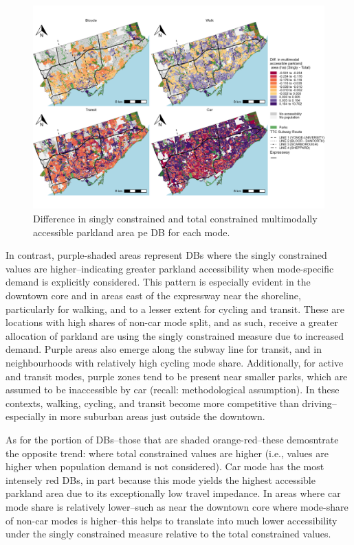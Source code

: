 \documentclass[
11pt, %
oneside, %
english, %
singlespacing, %
]{macthesis} %
\begin{document}
\begin{figure}

{\centering \includegraphics[width=6in]{./data/figures/chp5-mm_parkland_diff_conc_access_DB_plots} 

}

\caption{\label{fig:chp5-mm_parkland_diff_conc_access_DB_plots}Difference in singly constrained and total constrained multimodally accessible parkland area pe DB for each mode.}\label{fig:unnamed-chunk-78}
\end{figure}

In contrast, purple-shaded areas represent DBs where the singly constrained values are higher--indicating greater parkland accessibility when mode-specific demand is explicitly considered. This pattern is especially evident in the downtown core and in areas east of the expressway near the shoreline, particularly for walking, and to a lesser extent for cycling and transit. These are locations with high shares of non-car mode split, and as such, receive a greater allocation of parkland are using the singly constrained measure due to increased demand. Purple areas also emerge along the subway line for transit, and in neighbourhoods with relatively high cycling mode share. Additionally, for active and transit modes, purple zones tend to be present near smaller parks, which are assumed to be inaccessible by car (recall: methodological assumption). In these contexts, walking, cycling, and transit become more competitive than driving--especially in more suburban areas just outside the downtown.

As for the portion of DBs--those that are shaded orange-red--these demosntrate the opposite trend: where total constrained values are higher (i.e., values are higher when population demand is not considered). Car mode has the most intensely red DBs, in part because this mode yields the highest accessible parkland area due to its exceptionally low travel impedance. In areas where car mode share is relatively lower--such as near the downtown core where mode-share of non-car modes is higher--this helps to translate into much lower accessibility under the singly constrained measure relative to the total constrained values.
\end{document}
